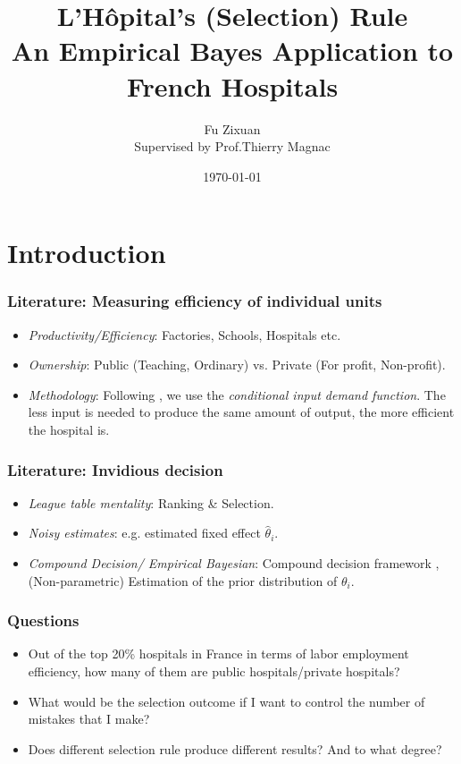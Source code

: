 \documentclass[10pt,mathserif,aspectratio=169]{beamer}
\title{\large \bfseries L'Hôpital's (Selection) Rule\\
  An Empirical Bayes Application to French Hospitals}
\author{Fu Zixuan\\[3ex]
  Supervised by Prof.Thierry Magnac}
\date{\today}
\begin{document}
\frame{
  \thispagestyle{empty}
  \titlepage
}

\section{Introduction}

\begin{frame}[label=literature]
  \frametitle{Literature: Measuring efficiency of individual units}
  \begin{itemize}\itemsep=12pt

    \item \textit{Productivity/Efficiency}: Factories, Schools, Hospitals etc.
    \item \textit{Ownership}: Public (Teaching, Ordinary) vs. Private (For profit, Non-profit).
    \item \textit{Methodology}: Following \citet{croiset2024hospitals}, we use the \textit{conditional input demand function}.
          The less input is needed to produce the same amount
          of output, the more efficient the hospital is.\hyperlink{inputdemand}{}
  \end{itemize}
\end{frame}

\begin{frame}
  \frametitle{Literature: Invidious decision}
  \begin{itemize}\itemsep=12pt
    \item \textit{League table mentality}: Ranking \& Selection.\citep{gu2023invidious}
    \item \textit{Noisy estimates}: e.g. estimated fixed effect $\hat{\theta}_i$. \citep{chetty2014measuring,kline2022systemic}
    \item \textit{Compound Decision/ Empirical Bayesian}: Compound decision framework \citep{robbins1956empirical}, (Non-parametric) Estimation of the prior distribution of $\theta_i$. \citep{koenker2014convex, gu2017empirical}
  \end{itemize}
\end{frame}

\begin{frame}
  \frametitle{Questions}
  \begin{itemize}\itemsep=12pt
    \item Out of the top 20\% hospitals in France in terms of labor employment
          efficiency, how many of them are public hospitals/private hospitals?
    \item What would be the selection outcome if I want to control the number of mistakes
          that I make?
    \item Does different selection rule produce different results? And to what degree?
  \end{itemize}
\end{frame}
\end{document}
